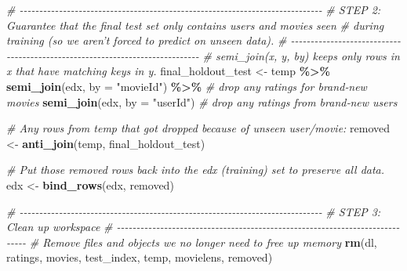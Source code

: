 \documentclass[
]{article}
\newenvironment{Shaded}{\begin{snugshade}}{\end{snugshade}}
\newcommand{\AttributeTok}[1]{\textcolor[rgb]{0.13,0.29,0.53}{#1}}
\newcommand{\CommentTok}[1]{\textcolor[rgb]{0.56,0.35,0.01}{\textit{#1}}}
\newcommand{\FunctionTok}[1]{\textcolor[rgb]{0.13,0.29,0.53}{\textbf{#1}}}
\newcommand{\NormalTok}[1]{#1}
\newcommand{\OtherTok}[1]{\textcolor[rgb]{0.56,0.35,0.01}{#1}}
\newcommand{\SpecialCharTok}[1]{\textcolor[rgb]{0.81,0.36,0.00}{\textbf{#1}}}
\newcommand{\StringTok}[1]{\textcolor[rgb]{0.31,0.60,0.02}{#1}}
\begin{document}
\begin{Shaded}
\begin{Highlighting}[]
\CommentTok{\# {-}{-}{-}{-}{-}{-}{-}{-}{-}{-}{-}{-}{-}{-}{-}{-}{-}{-}{-}{-}{-}{-}{-}{-}{-}{-}{-}{-}{-}{-}{-}{-}{-}{-}{-}{-}{-}{-}{-}{-}{-}{-}{-}{-}{-}{-}{-}{-}{-}{-}{-}{-}{-}{-}{-}{-}{-}{-}{-}{-}{-}{-}{-}{-}{-}{-}{-}{-}{-}{-}{-}{-}{-}{-}{-}{-}{-}}
\CommentTok{\# STEP 2: Guarantee that the final test set only contains users and movies seen}
\CommentTok{\#            during training (so we aren’t forced to predict on unseen data).}
\CommentTok{\# {-}{-}{-}{-}{-}{-}{-}{-}{-}{-}{-}{-}{-}{-}{-}{-}{-}{-}{-}{-}{-}{-}{-}{-}{-}{-}{-}{-}{-}{-}{-}{-}{-}{-}{-}{-}{-}{-}{-}{-}{-}{-}{-}{-}{-}{-}{-}{-}{-}{-}{-}{-}{-}{-}{-}{-}{-}{-}{-}{-}{-}{-}{-}{-}{-}{-}{-}{-}{-}{-}{-}{-}{-}{-}{-}{-}{-}}
\CommentTok{\# semi\_join(x, y, by) keeps only rows in x that have matching keys in y.}
\NormalTok{final\_holdout\_test }\OtherTok{\textless{}{-}}\NormalTok{ temp }\SpecialCharTok{\%\textgreater{}\%} 
  \FunctionTok{semi\_join}\NormalTok{(edx, }\AttributeTok{by =} \StringTok{"movieId"}\NormalTok{) }\SpecialCharTok{\%\textgreater{}\%}  \CommentTok{\# drop any ratings for brand‐new movies}
  \FunctionTok{semi\_join}\NormalTok{(edx, }\AttributeTok{by =} \StringTok{"userId"}\NormalTok{)       }\CommentTok{\# drop any ratings from brand‐new users}

\CommentTok{\# Any rows from temp that got dropped because of unseen user/movie:}
\NormalTok{removed }\OtherTok{\textless{}{-}} \FunctionTok{anti\_join}\NormalTok{(temp, final\_holdout\_test)}

\CommentTok{\# Put those removed rows back into the edx (training) set to preserve all data.}
\NormalTok{edx }\OtherTok{\textless{}{-}} \FunctionTok{bind\_rows}\NormalTok{(edx, removed)}

\CommentTok{\# {-}{-}{-}{-}{-}{-}{-}{-}{-}{-}{-}{-}{-}{-}{-}{-}{-}{-}{-}{-}{-}{-}{-}{-}{-}{-}{-}{-}{-}{-}{-}{-}{-}{-}{-}{-}{-}{-}{-}{-}{-}{-}{-}{-}{-}{-}{-}{-}{-}{-}{-}{-}{-}{-}{-}{-}{-}{-}{-}{-}{-}{-}{-}{-}{-}{-}{-}{-}{-}{-}{-}{-}{-}{-}{-}{-}{-}}
\CommentTok{\# STEP 3: Clean up workspace}
\CommentTok{\# {-}{-}{-}{-}{-}{-}{-}{-}{-}{-}{-}{-}{-}{-}{-}{-}{-}{-}{-}{-}{-}{-}{-}{-}{-}{-}{-}{-}{-}{-}{-}{-}{-}{-}{-}{-}{-}{-}{-}{-}{-}{-}{-}{-}{-}{-}{-}{-}{-}{-}{-}{-}{-}{-}{-}{-}{-}{-}{-}{-}{-}{-}{-}{-}{-}{-}{-}{-}{-}{-}{-}{-}{-}{-}{-}{-}{-}}
\CommentTok{\# Remove files and objects we no longer need to free up memory}
\FunctionTok{rm}\NormalTok{(dl, ratings, movies, test\_index, temp, movielens, removed)}
\end{Highlighting}
\end{Shaded}
\end{document}
